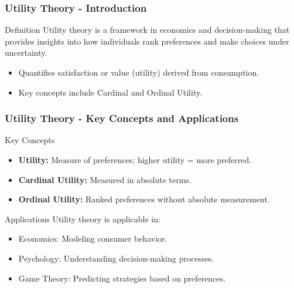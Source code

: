 \documentclass[aspectratio=169]{beamer}
\begin{document}
\begin{frame}[fragile]
    \frametitle{Utility Theory - Introduction}
    \begin{block}{Definition}
        Utility theory is a framework in economics and decision-making that provides insights into how individuals rank preferences and make choices under uncertainty.
    \end{block}
    \begin{itemize}
        \item Quantifies satisfaction or value (utility) derived from consumption.
        \item Key concepts include Cardinal and Ordinal Utility.
    \end{itemize}
\end{frame}

\begin{frame}[fragile]
    \frametitle{Utility Theory - Key Concepts and Applications}
    \begin{block}{Key Concepts}
        \begin{itemize}
            \item \textbf{Utility:} Measure of preferences; higher utility = more preferred.
            \item \textbf{Cardinal Utility:} Measured in absolute terms.
            \item \textbf{Ordinal Utility:} Ranked preferences without absolute measurement.
        \end{itemize}
    \end{block}
    
    \begin{block}{Applications}
        Utility theory is applicable in:
        \begin{itemize}
            \item Economics: Modeling consumer behavior.
            \item Psychology: Understanding decision-making processes.
            \item Game Theory: Predicting strategies based on preferences.
        \end{itemize}
    \end{block}
\end{frame}
\end{document}
